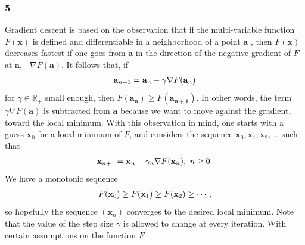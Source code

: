\documentclass{article}
\begin{document}
\subsubsection*{5}
Gradient descent is based on the observation that if the multi-variable function 
${\displaystyle F(\mathbf {x} )}$
is defined and differentiable in a neighborhood of a point 
${\displaystyle \mathbf {a} }$ , 
then 
${\displaystyle F(\mathbf {x} )}$
 decreases fastest if one goes from 
${\displaystyle \mathbf {a} }$
 in the direction of the negative gradient of 
${\displaystyle F}$
 at ${\displaystyle \mathbf {a} ,-\nabla F(\mathbf {a} )}$. 
It follows that, if\\
\begin{equation}\notag
\begin{aligned}
{\displaystyle \mathbf {a} _{n+1}=\mathbf {a} _{n}-\gamma \nabla F(\mathbf {a} _{n})}
\end{aligned}
\end{equation}
for 
${\displaystyle \gamma \in \mathbb {R} _{+}}$
 small enough, then 
${\displaystyle F(\mathbf {a_{n}} )\geq F(\mathbf {a_{n+1}} )}$.
 In other words, the term ${\displaystyle \gamma \nabla F(\mathbf {a} )}$
is subtracted from 
${\displaystyle \mathbf {a} }$
 because we want to move against the gradient, toward the local minimum. With this observation in mind, one starts with a guess 
${\displaystyle \mathbf {x} _{0}}$
 for a local minimum of 
${\displaystyle F}$, 
and considers the sequence 
${\displaystyle \mathbf {x} _{0},\mathbf {x} _{1},\mathbf {x} _{2},\ldots }$
 such that\\
\begin{equation}\notag
\begin{aligned}
\mathbf {x} _{n+1}=\mathbf {x} _{n}-\gamma _{n}\nabla F(\mathbf {x} _{n}),\ n\geq 0.
\end{aligned}
\end{equation}
We have a monotonic sequence\\
\begin{equation}\notag
\begin{aligned}
{\displaystyle F(\mathbf {x} _{0})\geq F(\mathbf {x} _{1})\geq F(\mathbf {x} _{2})\geq \cdots ,}
\end{aligned}
\end{equation}
so hopefully the sequence 
${\displaystyle (\mathbf {x} _{n})}$
 converges to the desired local minimum. Note that the value of the step size 
${\displaystyle \gamma }$
  is allowed to change at every iteration. With certain assumptions on the function 
${\displaystyle F}$
\end{document}
